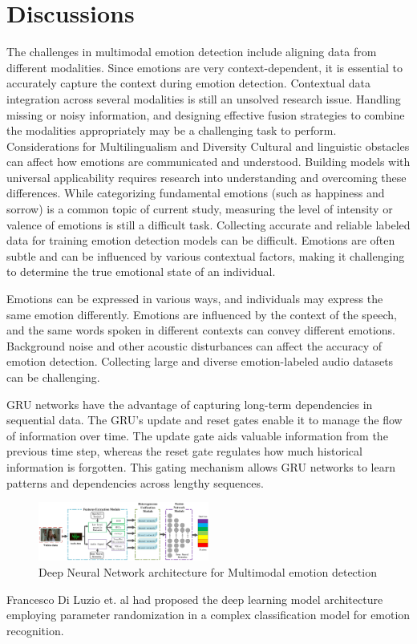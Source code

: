 \documentclass[conference]{IEEEtran}
\begin{document}
\section{Discussions}
The challenges in multimodal emotion detection include aligning data from different modalities.
Since emotions are very context-dependent, it is essential to accurately capture the context during emotion detection. Contextual data integration across several modalities is still an unsolved research issue.
Handling missing or noisy information, and designing effective fusion strategies to combine the modalities appropriately may be a challenging task to perform. \cite{liang2020semi}
Considerations for Multilingualism and Diversity Cultural and linguistic obstacles can affect how emotions are communicated and understood. Building models with universal applicability requires research into understanding and overcoming these differences.
While categorizing fundamental emotions (such as happiness and sorrow) is a common topic of current study, measuring the level of intensity or valence of emotions is still a difficult task.
Collecting accurate and reliable labeled data for training emotion detection models can be difficult. Emotions are often subtle and can be influenced by various contextual factors, making it challenging to determine the true emotional state of an individual.

Emotions can be expressed in various ways, and individuals may express the same emotion differently. Emotions are influenced by the context of the speech, and the same words spoken in different contexts can convey different emotions. Background noise and other acoustic disturbances can affect the accuracy of emotion detection. Collecting large and diverse emotion-labeled audio datasets can be challenging.

\cite{jia2022multimodal} GRU networks have the advantage of capturing long-term dependencies in sequential data. The GRU's update and reset gates enable it to manage the flow of information over time. The update gate aids valuable information from the previous time step, whereas the reset gate regulates how much historical information is forgotten. This gating mechanism allows GRU networks to learn patterns and dependencies across lengthy sequences.

\begin{center}
\begin{figure}
\centerline{\includegraphics[width=0.5\textwidth]{DNN.png}}
\caption{Deep Neural Network architecture for Multimodal emotion detection \cite{s19122730}}
\end{figure}
\end{center}
Francesco Di Luzio et. al \cite{di2023randomized} had proposed the deep learning model  architecture employing parameter randomization in a complex classification model for emotion recognition. 
\end{document}
